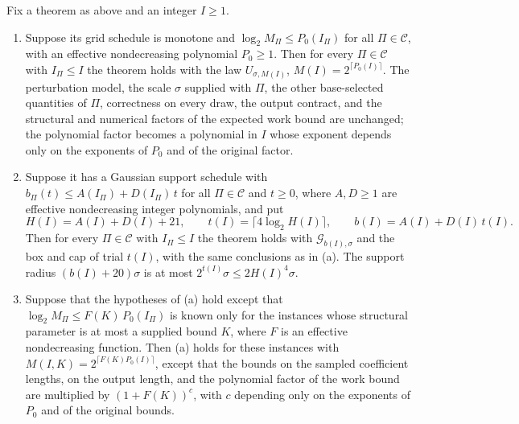 \begin{corollary}\label{cor:count:universal-law}
Fix a theorem as above and an integer $I\ge1$.
\begin{enumerate}[label=(\alph*)]
\item\label{it:count:ul-grid} Suppose its grid schedule is monotone and
 $\log_2M_\Pi\le P_0(I_\Pi)$ for all $\Pi\in\mathcal C$, with an effective
 nondecreasing polynomial $P_0\ge1$. Then for every $\Pi\in\mathcal C$ with
 $I_\Pi\le I$ the theorem holds with the law $U_{\sigma,M(I)}$,
 $M(I)=2^{\lceil P_0(I)\rceil}$. The perturbation model, the scale $\sigma$
 supplied with $\Pi$, the other base-selected quantities of $\Pi$,
 correctness on every draw, the output contract, and the structural and
 numerical factors of the expected work bound are unchanged; the polynomial
 factor becomes a polynomial in $I$ whose exponent depends only on the
 exponents of $P_0$ and of the original factor.
\item\label{it:count:ul-gauss} Suppose it has a Gaussian support schedule
 with $b_\Pi(t)\le A(I_\Pi)+D(I_\Pi)\,t$ for all $\Pi\in\mathcal C$ and
 $t\ge0$, where $A,D\ge1$ are effective nondecreasing integer polynomials, and
 put
 \[
  H(I)=A(I)+D(I)+21,\qquad t(I)=\lceil4\log_2H(I)\rceil,\qquad
  b(I)=A(I)+D(I)\,t(I).
 \]
 Then for every $\Pi\in\mathcal C$ with $I_\Pi\le I$ the theorem holds with
 $\mathcal G_{b(I),\sigma}$ and the box and cap of trial $t(I)$, with the
 same conclusions as in (a). The support radius $(b(I)+20)\sigma$ is at most
 $2^{t(I)}\sigma\le2H(I)^4\sigma$.
\item\label{it:count:ul-param} Suppose that the hypotheses of (a) hold except
 that $\log_2M_\Pi\le F(K)\,P_0(I_\Pi)$ is known only for the instances whose
 structural parameter is at most a supplied bound $K$, where $F$ is an
 effective nondecreasing function. Then (a) holds for these instances with
 $M(I,K)=2^{\lceil F(K)P_0(I)\rceil}$, except that the bounds on the sampled
 coefficient lengths, on the output length, and the polynomial factor of the
 work bound are multiplied by $(1+F(K))^{c}$, with $c$ depending only on the
 exponents of $P_0$ and of the original bounds.
\end{enumerate}
\end{corollary}

